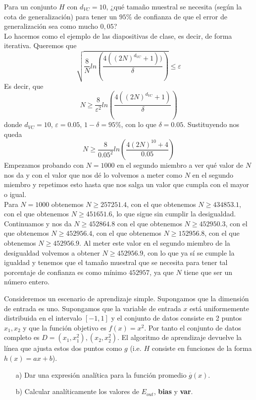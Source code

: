 \documentclass[12pt]{article}
\theoremstyle{definition}
\begin{document}
\begin{pregunta}
Para un conjunto $H$ con $d_{VC}=10$, ¿qué tamaño muestral se necesita (según la cota de generalización) para tener un $95\%$ de confianza de que el error de generalización sea como mucho $0,05$?\\

Lo hacemos como el ejemplo de las diapositivas de clase, es decir, de forma iterativa. Queremos que
\begin{equation}
\sqrt{\frac{8}{N}ln(\frac{4((2N)^{d_{VC}} + 1))}{\delta})} \leq \varepsilon
\end{equation}
Es decir, que 
\begin{equation}
N \geq \frac{8}{\varepsilon^2}ln(\frac{4((2N)^{d_{VC}}+1)}{\delta})
\end{equation}
donde $d_{VC}=10$, $\varepsilon=0.05$, $1-\delta=95\%$, con lo que $\delta=0.05$. Sustituyendo nos queda 
\begin{equation}
N \geq \frac{8}{0.05^2}ln(\frac{4(2N)^{10}+4}{0.05})
\end{equation}
Empezamos probando con $N=1000$ en el segundo miembro a ver qué valor de $N$ nos da y con el valor que nos dé lo volvemos a meter como $N$ en el segundo miembro y repetimos esto hasta que nos salga un valor que cumpla con el mayor o igual.\\
Para $N=1000$ obtenemos $N\geq257251.4$, con el que obtenemos $N\geq434853.1$, con el que obtenemos $N\geq451651.6$, lo que sigue sin cumplir la desigualdad. Continuamos y nos da $N\geq452864.8$ con el que obtenemos $N\geq452950.3$, con el que obtenemos $N\geq452956.4$, con el que obtenemos $N\geq152956.8$, con el que obtenemos $N\geq452956.9$. Al meter este valor en el segundo miembro de la desigualdad volvemos a obtener $N\geq452956.9$, con lo que ya sí se cumple la igualdad y tenemos que el tamaño muestral que se necesita para tener tal porcentaje de confianza es como mínimo $452957$, ya que $N$ tiene que ser un número entero.
\end{pregunta}

\begin{pregunta}
Consideremos un escenario de aprendizaje simple. Supongamos que la dimensión de entrada es uno. Supongamos que la variable de entrada $x$ está uniformemente distribuida en el intervalo $[-1,1]$ y el conjunto de datos consiste en 2 puntos ${x_1,x_2}$ y que la función objetivo es $f(x)=x^2$. Por tanto el conjunto de datos completo es $D={(x_1,x_1^2), (x_2,x_2^2)}$. El algoritmo de aprendizaje devuelve la línea que ajusta estos dos puntos como $g$ (i.e. $H$ consiste en funciones de la forma $h(x)=ax+b$).
\begin{enumerate}
\item[a)] Dar una expresión analítica para la función promedio $\overline{g}(x)$.
\item[b)] Calcular analíticamente los valores de $E_{out}$, \textbf{bias} y \textbf{var}.
\end{enumerate}

\end{pregunta}
\end{document}
